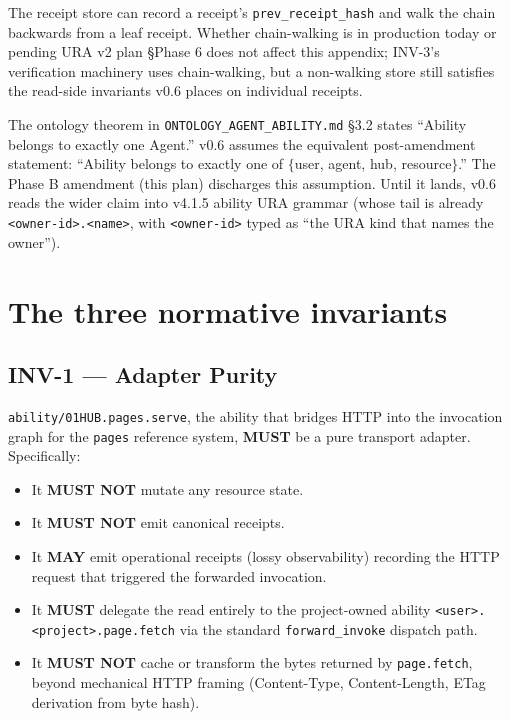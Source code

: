 \documentclass[11pt,a4paper]{article}
\theoremstyle{definition}
\begin{document}
\begin{assumptionbox}
The receipt store can record a receipt's \texttt{prev\_receipt\_hash}
and walk the chain backwards from a leaf receipt. Whether
chain-walking is in production today or pending URA v2 plan
§Phase 6 does not affect this appendix; INV-3's verification
machinery uses chain-walking, but a non-walking store still
satisfies the read-side invariants v0.6 places on individual
receipts.
\end{assumptionbox}

\begin{assumptionbox}
The ontology theorem in
\texttt{ONTOLOGY\_AGENT\_ABILITY.md} §3.2 states ``Ability
belongs to exactly one Agent.'' v0.6 assumes the equivalent
post-amendment statement: ``Ability belongs to exactly one of
\(\{\)user, agent, hub, resource\(\}\).'' The Phase B
amendment (this plan) discharges this assumption. Until it
lands, v0.6 reads the wider claim into v4.1.5 ability URA
grammar (whose tail is already \texttt{<owner-id>.<name>}, with
\texttt{<owner-id>} typed as ``the URA kind that names the
owner'').
\end{assumptionbox}

\section{The three normative invariants}
\label{sec:invariants}

\subsection{INV-1 --- Adapter Purity}

\begin{invariant}
\texttt{ability/01HUB.pages.serve}, the ability that bridges
HTTP into the invocation graph for the \texttt{pages} reference
system, \textbf{MUST} be a pure transport adapter. Specifically:
\begin{itemize}[leftmargin=2em,itemsep=0.1em]
    \item It \textbf{MUST NOT} mutate any resource state.
    \item It \textbf{MUST NOT} emit canonical receipts.
    \item It \textbf{MAY} emit operational receipts (lossy
    observability) recording the HTTP request that triggered the
    forwarded invocation.
    \item It \textbf{MUST} delegate the read entirely to the
    project-owned ability
    \texttt{<user>.<project>.page.fetch} via the standard
    \texttt{forward\_invoke} dispatch path.
    \item It \textbf{MUST NOT} cache or transform the bytes
    returned by \texttt{page.fetch}, beyond mechanical HTTP
    framing (Content-Type, Content-Length, ETag derivation
    from byte hash).
\end{itemize}
\end{invariant}
\end{document}
